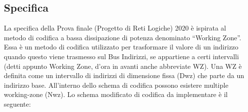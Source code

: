 \documentclass{article}
\begin{document}
\subsection{Specifica}
La specifica della Prova finale (Progetto di Reti Logiche) 2020 è ispirata al metodo di codifica a bassa dissipazione di potenza denominato “Working Zone”.
Essa è un metodo di codifica utilizzato per trasformare il valore di un indirizzo quando questo viene trasmesso sul Bus Indirizzi, se appartiene a certi intervalli (detti appunto Working Zone, d'ora in avanti anche abbreviate WZ).
Una WZ è definita come un intervallo di indirizzi di dimensione fissa (Dwz) che parte da un indirizzo base. All'interno dello schema di codifica possono esistere multiple working-zone (Nwz).\newline\newline
Lo schema modificato di codifica da implementare è il seguente:
\end{document}
